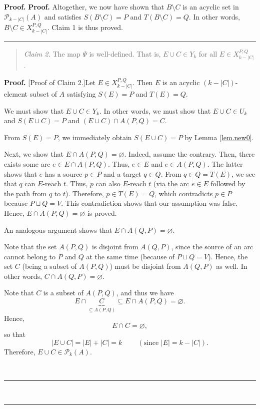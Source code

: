 \documentclass[numbers=enddot,12pt,final,onecolumn,notitlepage]{scrartcl}%
\theoremstyle{definition}
\newenvironment{statement}{\begin{quote}}{\end{quote}}
\newenvironment{proof}[1][Proof]{\noindent\textbf{#1.} }{\ \rule{0.5em}{0.5em}}
\theoremstyle{plainsl}
\begin{document}
\begin{proof}
\begin{proof}
Altogether, we now have shown that $B\setminus C$ is an acyclic set in
$\mathcal{P}_{k-\left\vert C\right\vert }\left(  A\right)  $ and satisfies
$S\left(  B\setminus C\right)  =P$ and $T\left(  B\setminus C\right)  =Q$. In
other words, $B\setminus C\in X_{k-\left\vert C\right\vert }^{P,Q}$. Claim 1
is thus proved.
\end{proof}

\begin{statement}
\textit{Claim 2.} The map $\Psi$ is well-defined. That is, $E\cup C\in Y_{k}$
for all $E\in X_{k-|C|}^{P,Q}$.
\end{statement}

\begin{proof}
[Proof of Claim 2.]Let $E\in X_{k-|C|}^{P,Q}$. Then $E$ is an acyclic $\left(
k-\left\vert C\right\vert \right)  $-element subset of $A$ satisfying
$S\left(  E\right)  =P$ and $T\left(  E\right)  =Q$.

We must show that $E\cup C\in Y_{k}$. In other words, we must show that $E\cup
C\in U_{k}$ and $S\left(  E\cup C\right)  =P$ and $\left(  E\cup C\right)
\cap A\left(  P,Q\right)  =C$.

From $S\left(  E\right)  =P$, we immediately obtain $S\left(  E\cup C\right)
=P$ by Lemma \ref{lem.new0}.

Next, we show that $E\cap A\left(  P,Q\right)  =\varnothing$. Indeed, assume
the contrary. Then, there exists some arc $e\in E\cap A\left(  P,Q\right)  $.
Thus, $e\in E$ and $e\in A\left(  P,Q\right)  $. The latter shows that $e$ has
a source $p\in P$ and a target $q\in Q$. From $q\in Q=T\left(  E\right)  $, we
see that $q$ can $E$-reach $t$. Thus, $p$ can also $E$-reach $t$ (via the arc
$e\in E$ followed by the path from $q$ to $t$). Therefore, $p\in T\left(
E\right)  =Q$, which contradicts $p\in P$ because $P\sqcup Q=V$. This
contradiction shows that our assumption was false. Hence, $E\cap A\left(
P,Q\right)  =\varnothing$ is proved.

An analogous argument shows that $E\cap A\left(  Q,P\right)  =\varnothing$.

Note that the set $A\left(  P,Q\right)  $ is disjoint from $A\left(
Q,P\right)  $, since the source of an arc cannot belong to $P$ and $Q$ at the
same time (because of $P\sqcup Q=V$). Hence, the set $C$ (being a subset of
$A\left(  P,Q\right)  $) must be disjoint from $A\left(  Q,P\right)  $ as
well. In other words, $C\cap A\left(  Q,P\right)  =\varnothing$.

Note that $C$ is a subset of $A\left(  P,Q\right)  $, and thus we have
\[
E\cap\underbrace{C}_{\subseteq A\left(  P,Q\right)  }\subseteq E\cap A\left(
P,Q\right)  =\varnothing.
\]
Hence,
\begin{equation}
E\cap C=\varnothing, \label{pf.lem.new4.c2.pf.empty}%
\end{equation}
so that%
\[
\left\vert E\cup C\right\vert =\left\vert E\right\vert +\left\vert
C\right\vert =k\ \ \ \ \ \ \ \ \ \ \left(  \text{since }\left\vert
E\right\vert =k-\left\vert C\right\vert \right)  .
\]
Therefore, $E\cup C\in\mathcal{P}_{k}\left(  A\right)  $.


\end{proof}
\end{proof}
\end{document}
